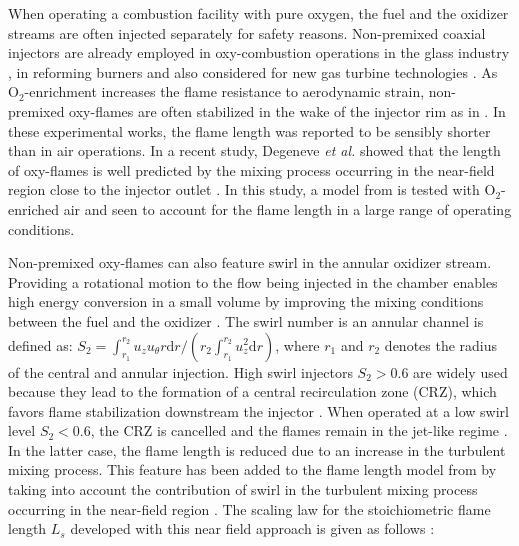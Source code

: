 \documentclass[twocolumn,10pt]{asme2e}
\begin{document}
When operating a combustion facility with pure oxygen, the fuel and the oxidizer streams are often injected separately for safety reasons. Non-premixed coaxial injectors are already employed in oxy-combustion operations in the glass industry \cite{auchet2008first}, in reforming burners \cite{forster20173d} and also considered for new gas turbine technologies \cite{sanz2008qualitative}. As O$_2$-enrichment increases the flame resistance to aerodynamic strain, non-premixed oxy-flames are often stabilized in the wake of the injector rim as in \cite{kim2006emission,sautet2001length,degeneve2019scaling}. In these experimental works, the flame length was reported to be sensibly shorter than in air operations.
In a recent study, Degeneve \textit{et al.} showed that the length of oxy-flames is well predicted by the mixing process occurring in the near-field region close to the injector outlet \cite{degeneve2019scaling}. In this study, a model from \cite{villermaux2000mixing,schumaker2009coaxial} is tested with O$_2$-enriched air and seen to account for the flame length in a large range of operating conditions.



Non-premixed oxy-flames can also feature swirl in the annular oxidizer stream. Providing a rotational motion to the flow being injected in the chamber enables high energy conversion in a small volume by improving the mixing conditions between the fuel and the oxidizer \cite{merlo2014combustion}. The swirl number is an annular channel is defined as: $S_2= \int_{r_1}^{r_2} u_z u_\theta r \mathrm{d} r/(r_2 \int_{r_1}^{r_2} u_z^2 \mathrm{d}r)$, where $r_1$ and $r_2$ denotes the radius of the central and annular injection. High swirl injectors $S_2>0.6$ are widely used because they lead to the formation of a central recirculation zone (CRZ), which favors flame stabilization downstream the injector . When operated at a low swirl level $S_2<0.6$, the CRZ is cancelled and the flames remain in the jet-like regime \cite{chen1990comparison,degeneve2019effects}. In the latter case, the flame length is reduced due to an increase in the turbulent mixing process. This feature has been added to the flame length model from \cite{villermaux2000mixing} by taking into account the contribution of swirl in the turbulent mixing process occurring in the near-field region \cite{degeneve2019scaling}. The scaling law for the stoichiometric flame length $L_s$ developed with this near field approach is given as follows \cite{villermaux2000mixing,degeneve2019scaling}:
\end{document}
